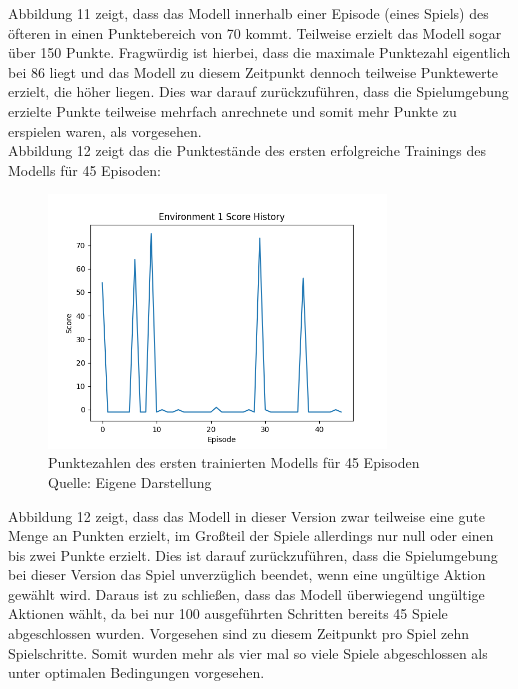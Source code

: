 Abbildung 11 zeigt, dass das Modell innerhalb einer Episode (eines Spiels) des öfteren in einen Punktebereich von 70 kommt. Teilweise erzielt das Modell sogar über 150 Punkte. Fragwürdig ist hierbei, dass die maximale Punktezahl eigentlich bei 86 liegt und das Modell zu diesem Zeitpunkt dennoch teilweise Punktewerte erzielt, die höher liegen. Dies war darauf zurückzuführen, dass die Spielumgebung erzielte Punkte teilweise mehrfach anrechnete und somit mehr Punkte zu erspielen waren, als vorgesehen.\\

Abbildung 12 zeigt das die Punktestände des ersten erfolgreiche Trainings des Modells für 45 Episoden:
\nopagebreak
\begin{figure}[H]
	\centering
	\includegraphics[width=0.8\textwidth]{Bilder/firstpropertraining100steps} 
	\caption[Punktezahlen des ersten trainierten Modells für 45 Episoden]{Punktezahlen des ersten trainierten Modells für 45 Episoden\\ Quelle: Eigene Darstellung}
\end{figure}

Abbildung 12 zeigt, dass das Modell in dieser Version zwar teilweise eine gute Menge an Punkten erzielt, im Großteil der Spiele allerdings nur null oder einen bis zwei Punkte erzielt. Dies ist darauf zurückzuführen, dass die Spielumgebung bei dieser Version das Spiel unverzüglich beendet, wenn eine ungültige Aktion gewählt wird. Daraus ist zu schließen, dass das Modell überwiegend ungültige Aktionen wählt, da bei nur 100 ausgeführten Schritten bereits 45 Spiele abgeschlossen wurden. Vorgesehen sind zu diesem Zeitpunkt pro Spiel zehn Spielschritte. Somit wurden mehr als vier mal so viele Spiele abgeschlossen als unter optimalen Bedingungen vorgesehen.
